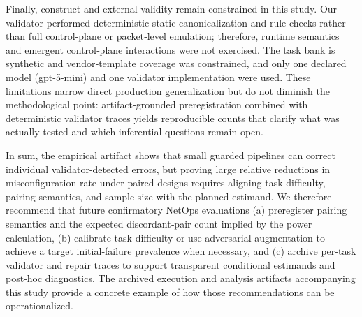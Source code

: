 \documentclass[conference]{IEEEtran}
\begin{document}
Finally, construct and external validity remain constrained in this study. Our validator performed deterministic static canonicalization and rule checks rather than full control‑plane or packet‑level emulation; therefore, runtime semantics and emergent control‑plane interactions were not exercised. The task bank is synthetic and vendor‑template coverage was constrained, and only one declared model (gpt-5-mini) and one validator implementation were used. These limitations narrow direct production generalization but do not diminish the methodological point: artifact‑grounded preregistration combined with deterministic validator traces yields reproducible counts that clarify what was actually tested and which inferential questions remain open.

In sum, the empirical artifact shows that small guarded pipelines can correct individual validator‑detected errors, but proving large relative reductions in misconfiguration rate under paired designs requires aligning task difficulty, pairing semantics, and sample size with the planned estimand. We therefore recommend that future confirmatory NetOps evaluations (a) preregister pairing semantics and the expected discordant‑pair count implied by the power calculation, (b) calibrate task difficulty or use adversarial augmentation to achieve a target initial‑failure prevalence when necessary, and (c) archive per‑task validator and repair traces to support transparent conditional estimands and post‑hoc diagnostics. The archived execution and analysis artifacts accompanying this study provide a concrete example of how those recommendations can be operationalized.
\end{document}
